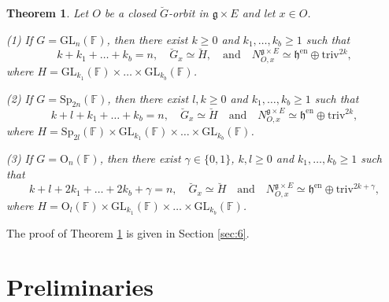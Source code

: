 \documentclass[12pt]{amsart}
\newtheorem{theorem}[lm]{Theorem}
\theoremstyle{definition}
\theoremstyle{remark}\newtheorem{rmk}[lm]{Remark}
\newcommand{\RO}{{\mathrm {O}}}
\newcommand{\GL}{{\mathrm{GL}}}
\newcommand{\Sp}{{\mathrm{Sp}}}
\newcommand{\triv}{\mathrm{triv}}
\newcommand{\g}{\mathfrak g}
\newcommand{\h}{\mathfrak h}
\newcommand{\gl}{\mathfrak g \mathfrak l}
\newcommand{\C}{\mathbb{F}}
\begin{document}
	\begin{theorem}
		\label{thm:mainmvwsimple}
		Let $O$ be a closed $\breve{G}$-orbit in $\g\times E$ and let $x\in O$. 
		
		\noindent(1) If $G=\GL_n(\C)$, then there exist $k\ge 0$ and $k_1,\dots,k_b\geq 1$ such that
		\begin{equation*}
		k+k_1+\dots+k_b=n,\quad	\breve{G}_x\simeq\breve{H},\quad \text{and}\quad 
            N_{O,x}^{\g\times E}\simeq \h^{\mathrm{en}}\oplus\triv^{2k},
		\end{equation*}
        where $H=\GL_{k_1}(\C)\times\dots\times\GL_{k_b}(\C)$.
		
		\noindent(2) If $G=\Sp_{2n}(\C)$, then there exist $l,k\geq 0$ and $k_1,\dots,k_b\geq 1$ such that
		\begin{equation*}
			k+l+k_1+\dots+k_b=n,\quad\breve{G}_x\simeq\breve{H}\quad \text{and}\quad 
            N_{O,x}^{\g\times E}\simeq \h^{\mathrm{en}}\oplus\triv^{2k},
		\end{equation*}
		where $H=\Sp_{2l}(\C)\times\GL_{k_1}(\C)\times\dots\times\GL_{k_b}(\C)$.
		
		\noindent(3) If $G=\RO_{n}(\C)$, then there exist $\gamma\in\{0,1\}$, $k,l\geq 0$ and $k_1,\dots,k_b\geq 1$ such that
		\begin{equation*}
			k+l+2k_1+\dots+2k_b+\gamma=n,\quad \breve{G}_x\simeq\breve{H}\quad \text{and}\quad 
            N_{O,x}^{\g\times E}\simeq \h^{\mathrm{en}}\oplus\triv^{2k+\gamma},
		\end{equation*}
		where $H=\RO_{l}(\C)\times\GL_{k_1}(\C)\times\dots\times\GL_{k_b}(\C)$.
	\end{theorem}
	
    The proof of Theorem \ref{thm:mainmvwsimple} is given in Section \ref{sec:6}.
	\section{Preliminaries}
    
\end{document}
